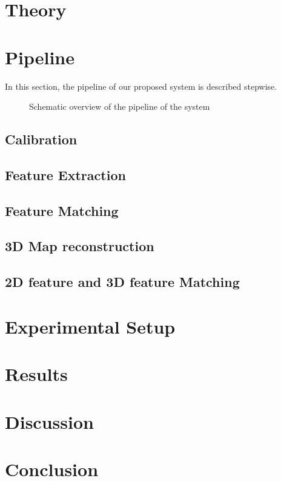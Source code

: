 \documentclass[a4paper]{article}
\begin{document}
\section{Theory}

\section{Pipeline}
In this section, the pipeline of our proposed system is described stepwise.

\begin{figure}[!hb]
\centerline{
}
\caption{Schematic overview of the pipeline of the system}
\label{fig:system}
\end{figure}

\subsection{Calibration}
\subsection{Feature Extraction}
\subsection{Feature Matching}
\subsection{3D Map reconstruction}
\subsection{2D feature and 3D feature Matching}



\section{Experimental Setup}

\section{Results}

\section{Discussion}

\section{Conclusion}
\end{document}
